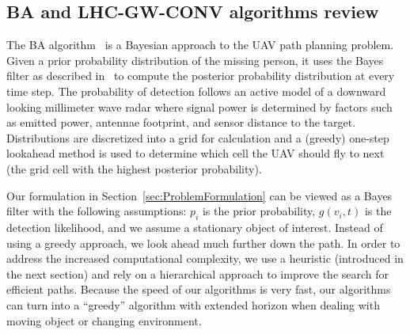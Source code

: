 \subsection{BA and LHC-GW-CONV algorithms review}
\label{BALHCReview}


The BA algorithm~\cite{Bourgault2006Optimal} is a Bayesian approach to the UAV path planning problem. Given a prior probability distribution of the missing person, it uses the Bayes filter as described in~\cite{Thrun2005Probabilistic} to compute the posterior probability distribution at every time step. 
The probability of detection follows an active model of a downward looking millimeter wave radar where signal power is determined by factors such as emitted power, antennae footprint, and sensor distance to the target. Distributions are discretized into a grid for calculation and a (greedy) one-step lookahead method is used to determine which cell the UAV should fly to next (the grid cell with the highest posterior probability). 

Our formulation in Section~\ref{sec:ProblemFormulation} can be viewed as a Bayes filter with the following assumptions: $p_i$ is the prior probability, $g(v_i,t)$ is the detection likelihood, and we assume a stationary object of interest. Instead of using a greedy approach, we look ahead much further down the path. In order to address the increased computational complexity, we use a heuristic (introduced in the next section) and rely on a hierarchical approach to improve the search for efficient paths. Because the speed of our algorithms is very fast, our algorithms can turn into a ``greedy'' algorithm with extended horizon when dealing with moving object or changing environment.

